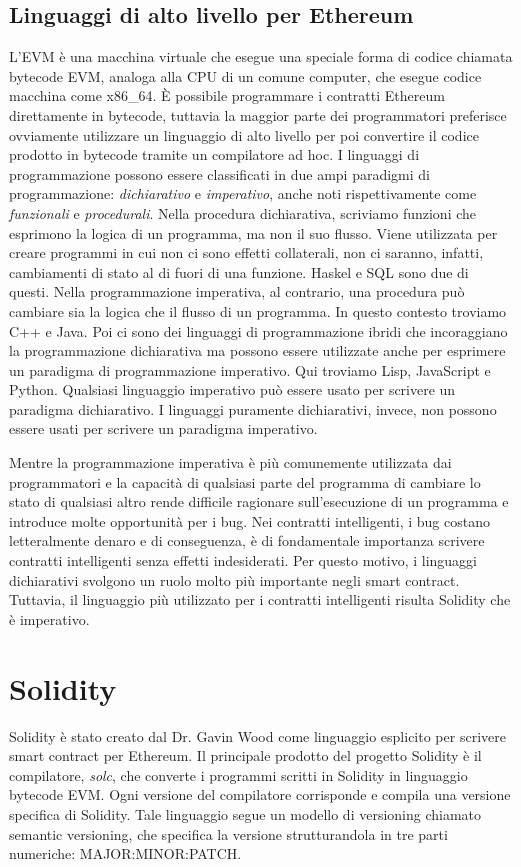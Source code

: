 \subsection*{Linguaggi di alto livello per Ethereum}
L'EVM è una macchina virtuale che esegue una speciale forma di codice chiamata bytecode EVM, analoga alla CPU di un comune computer, che esegue codice macchina come x86\_64. \`E possibile programmare i contratti Ethereum direttamente in bytecode, tuttavia la maggior parte dei programmatori preferisce ovviamente utilizzare un linguaggio di alto livello per poi convertire il codice prodotto in bytecode tramite un compilatore ad hoc. I linguaggi di programmazione possono essere classificati in due ampi paradigmi di programmazione: \textit{dichiarativo} e \textit{imperativo}, anche noti rispettivamente come \textit{funzionali} e \textit{procedurali}. Nella procedura dichiarativa, scriviamo funzioni che esprimono la logica di un programma, ma non il suo flusso. Viene utilizzata per creare programmi in cui non ci sono effetti collaterali, non ci saranno, infatti, cambiamenti di stato al di fuori di una funzione. Haskel e SQL sono due di questi. Nella programmazione imperativa, al contrario, una procedura può cambiare sia la logica che il flusso di un programma. In questo contesto troviamo C++ e Java. Poi ci sono dei linguaggi di programmazione ibridi che incoraggiano la programmazione dichiarativa ma possono essere utilizzate anche per esprimere un paradigma di programmazione imperativo. Qui troviamo Lisp, JavaScript e Python. Qualsiasi linguaggio imperativo può essere usato per scrivere un paradigma dichiarativo. I linguaggi puramente dichiarativi, invece, non possono essere usati per scrivere un paradigma imperativo.

Mentre la programmazione imperativa è più comunemente utilizzata dai programmatori e la capacità di qualsiasi parte del programma di cambiare lo stato di qualsiasi altro rende difficile ragionare sull'esecuzione di un programma e introduce molte opportunità per i bug. Nei contratti intelligenti, i bug costano letteralmente denaro e di conseguenza, è di fondamentale importanza scrivere contratti intelligenti senza effetti indesiderati. Per questo motivo, i linguaggi dichiarativi svolgono un ruolo molto più importante negli smart contract. Tuttavia, il linguaggio più utilizzato per i contratti intelligenti risulta Solidity che è imperativo.

\section{Solidity}
Solidity è stato creato dal Dr. Gavin Wood come linguaggio esplicito per scrivere smart contract per Ethereum. Il principale prodotto del progetto Solidity è il compilatore, \textit{solc}, che converte i programmi scritti in Solidity in linguaggio bytecode EVM. Ogni versione del compilatore corrisponde e compila una versione specifica di Solidity. Tale linguaggio segue un modello di versioning chiamato semantic versioning, che specifica la versione strutturandola in tre parti numeriche: MAJOR:MINOR:PATCH.


